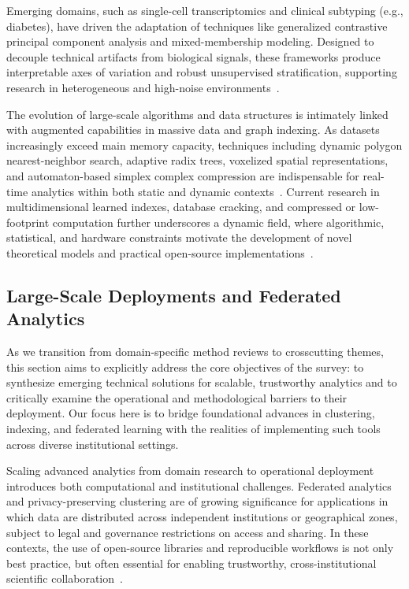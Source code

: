 \documentclass[sigconf]{acmart}
\begin{document}
Emerging domains, such as single-cell transcriptomics and clinical subtyping (e.g., diabetes), have driven the adaptation of techniques like generalized contrastive principal component analysis and mixed-membership modeling. Designed to decouple technical artifacts from biological signals, these frameworks produce interpretable axes of variation and robust unsupervised stratification, supporting research in heterogeneous and high-noise environments~\cite{ref77,ref81}.

The evolution of large-scale algorithms and data structures is intimately linked with augmented capabilities in massive data and graph indexing. As datasets increasingly exceed main memory capacity, techniques including dynamic polygon nearest-neighbor search, adaptive radix trees, voxelized spatial representations, and automaton-based simplex complex compression are indispensable for real-time analytics within both static and dynamic contexts~\cite{ref63,ref94,ref109,ref110}. Current research in multidimensional learned indexes, database cracking, and compressed or low-footprint computation further underscores a dynamic field, where algorithmic, statistical, and hardware constraints motivate the development of novel theoretical models and practical open-source implementations~\cite{ref97,ref98,ref107,ref108}.

\subsection{Large-Scale Deployments and Federated Analytics}

As we transition from domain-specific method reviews to crosscutting themes, this section aims to explicitly address the core objectives of the survey: to synthesize emerging technical solutions for scalable, trustworthy analytics and to critically examine the operational and methodological barriers to their deployment. Our focus here is to bridge foundational advances in clustering, indexing, and federated learning with the realities of implementing such tools across diverse institutional settings.

Scaling advanced analytics from domain research to operational deployment introduces both computational and institutional challenges. Federated analytics and privacy-preserving clustering are of growing significance for applications in which data are distributed across independent institutions or geographical zones, subject to legal and governance restrictions on access and sharing. In these contexts, the use of open-source libraries and reproducible workflows is not only best practice, but often essential for enabling trustworthy, cross-institutional scientific collaboration~\cite{ref116}.
\end{document}
